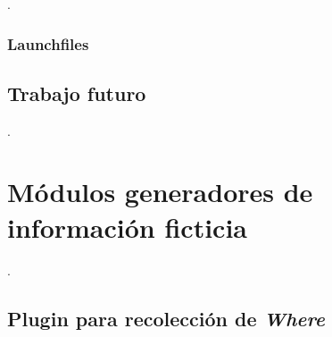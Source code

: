 .
\lstset{style=/Style/yaml/ROS}


\subsubsection{Launchfiles}



\subsection{Trabajo futuro}

.



\section{Módulos generadores de información ficticia}

.


\subsection{Plugin para recolección de \textit{Where}}

